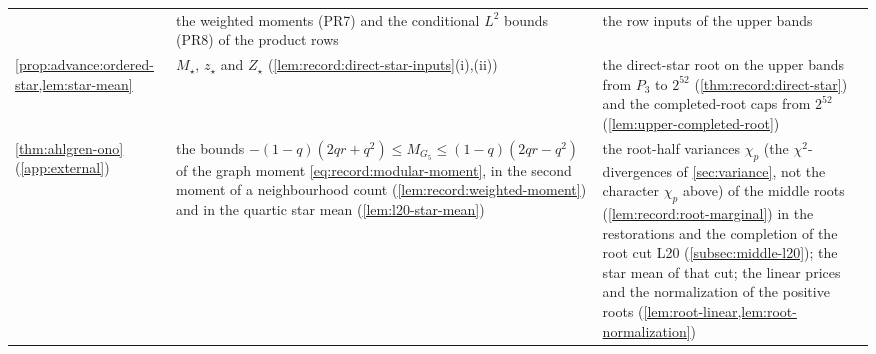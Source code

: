 \begin{table}[ht]
\begin{tabular}{@{}>{\raggedright\arraybackslash}p{3.1cm}%
>{\raggedright\arraybackslash}p{5.6cm}>{\raggedright\arraybackslash}p{5.4cm}@{}}
 & the weighted moments (PR7) and the conditional $L^2$ bounds (PR8) of the
   product rows
 & the row inputs of the upper bands\\
\cref{prop:advance:ordered-star,lem:star-mean}
 & $M_\star$, $z_\star$ and $Z_\star$ (\cref{lem:record:direct-star-inputs}(i),(ii))
 & the direct-star root on the upper bands from $P_3$ to $2^{52}$
   (\cref{thm:record:direct-star}) and the completed-root caps from $2^{52}$
   (\cref{lem:upper-completed-root})\\
\cref{thm:ahlgren-ono} (\cref{app:external})
 & the bounds $-(1-q)(2qr+q^2)\le M_{G_5}\le(1-q)(2qr-q^2)$ of the graph
   moment \eqref{eq:record:modular-moment}, in the second moment of a
   neighbourhood count (\cref{lem:record:weighted-moment}) and in the quartic
   star mean (\cref{lem:l20-star-mean})
 & the root-half variances $\chi_p$ (the $\chi^2$-divergences of \cref{sec:variance}, not the character $\chi_p$ above) of the middle roots
   (\cref{lem:record:root-marginal}) in the restorations and the completion of
   the root cut L20 (\cref{subsec:middle-l20}); the star mean of that cut; the
   linear prices and the normalization of the positive roots
   (\cref{lem:root-linear,lem:root-normalization})\\
\bottomrule
\end{tabular}
\end{table}

